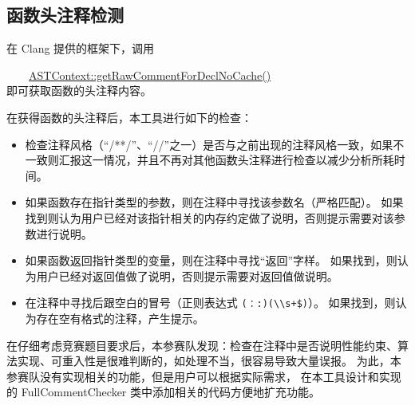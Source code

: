 \subsection{函数头注释检测}
\label{sec:core:comment}

在 Clang 提供的框架下，调用

  \ \ \ \ \href{https://clang.llvm.org/doxygen/classclang_1_1ASTContext.html#ac10b2ebc25da948d370e74f7688fd134}{ASTContext::getRawCommentForDeclNoCache()} 
\\即可获取函数的头注释内容。

在获得函数的头注释后，本工具进行如下的检查：

\begin{itemize}
  \item
  检查注释风格（“/**/”、“//”之一）是否与之前出现的注释风格一致，如果不一致则汇报这一情况，并且不再对其他函数头注释进行检查以减少分析所耗时间。

  \item 
  如果函数存在指针类型的参数，则在注释中寻找该参数名（严格匹配）。
  如果找到则认为用户已经对该指针相关的内存约定做了说明，否则提示需要对该参数进行说明。

  \item 
  如果函数返回指针类型的变量，则在注释中寻找“返回”字样。
  如果找到，则认为用户已经对返回值做了说明，否则提示需要对返回值做说明。

  \item
  在注释中寻找后跟空白的冒号（正则表达式 \texttt{(：\textbar{}:)(\textbackslash{}\textbackslash{}s+\textbar{}\$)}）。
  如果找到，则认为存在空有格式的注释，产生提示。

\end{itemize}

在仔细考虑竞赛题目要求后，本参赛队发现：检查在注释中是否说明性能约束、算法实现、可重入性是很难判断的，如处理不当，很容易导致大量误报。
为此，本参赛队没有实现相关的功能，但是用户可以根据实际需求，
在本工具设计和实现的 FullCommentChecker 类中添加相关的代码方便地扩充功能。
